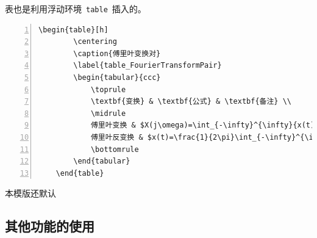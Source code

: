 表也是利用浮动环境~\verb|table|~插入的。

\begin{Verbatim}[gobble=1,frame=single,numbers=left]
	\begin{table}[h]
		\centering
		\caption{傅里叶变换对}
		\label{table_FourierTransformPair}
		\begin{tabular}{ccc}
			\toprule
			\textbf{变换} & \textbf{公式} & \textbf{备注} \\
			\midrule
			傅里叶变换 & $X(j\omega)=\int_{-\infty}^{\infty}{x(t)e^{-j\omega t}}dt$ & 无 \\
			傅里叶反变换 & $x(t)=\frac{1}{2\pi}\int_{-\infty}^{\infty}{X(j\omega)e^{j\omega t}}d\omega$ & 无 \\
			\bottomrule
		\end{tabular}
	\end{table}
\end{Verbatim}

本模版还默认
\subsection{其他功能的使用}
\label{Subsect_OtherFunctions}
